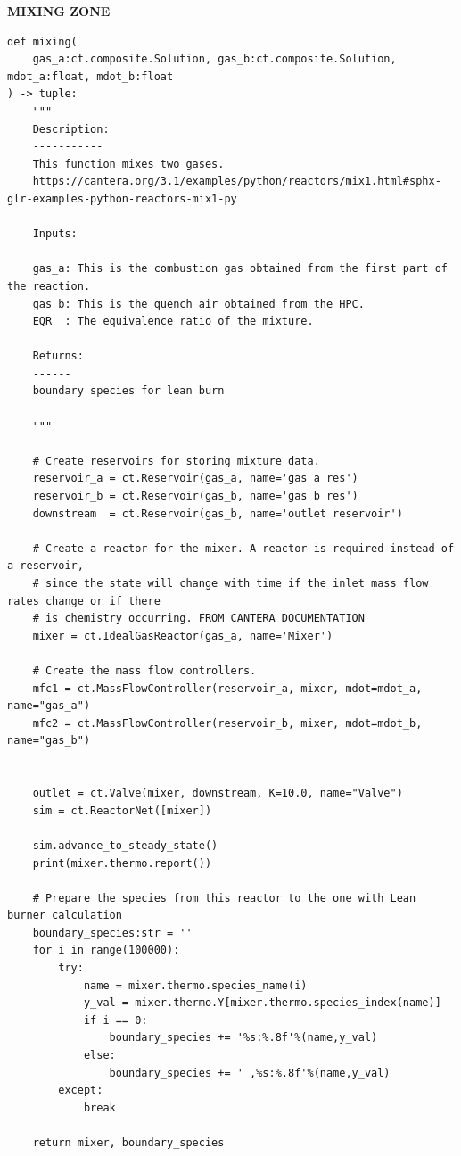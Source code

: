 \clearpage


\textbf{MIXING ZONE}

\begin{verbatim}
def mixing(
    gas_a:ct.composite.Solution, gas_b:ct.composite.Solution, mdot_a:float, mdot_b:float
) -> tuple:
    """
    Description:
    -----------
    This function mixes two gases.
    https://cantera.org/3.1/examples/python/reactors/mix1.html#sphx-glr-examples-python-reactors-mix1-py

    Inputs:
    ------
    gas_a: This is the combustion gas obtained from the first part of the reaction.
    gas_b: This is the quench air obtained from the HPC.
    EQR  : The equivalence ratio of the mixture.

    Returns:
    ------
    boundary species for lean burn
    
    """

    # Create reservoirs for storing mixture data.
    reservoir_a = ct.Reservoir(gas_a, name='gas a res')
    reservoir_b = ct.Reservoir(gas_b, name='gas b res')
    downstream  = ct.Reservoir(gas_b, name='outlet reservoir')

    # Create a reactor for the mixer. A reactor is required instead of a reservoir, 
    # since the state will change with time if the inlet mass flow rates change or if there 
    # is chemistry occurring. FROM CANTERA DOCUMENTATION
    mixer = ct.IdealGasReactor(gas_a, name='Mixer')

    # Create the mass flow controllers.
    mfc1 = ct.MassFlowController(reservoir_a, mixer, mdot=mdot_a, name="gas_a")
    mfc2 = ct.MassFlowController(reservoir_b, mixer, mdot=mdot_b, name="gas_b")


    outlet = ct.Valve(mixer, downstream, K=10.0, name="Valve")
    sim = ct.ReactorNet([mixer])

    sim.advance_to_steady_state()
    print(mixer.thermo.report())

    # Prepare the species from this reactor to the one with Lean burner calculation
    boundary_species:str = ''
    for i in range(100000):
        try:
            name = mixer.thermo.species_name(i)
            y_val = mixer.thermo.Y[mixer.thermo.species_index(name)]
            if i == 0:
                boundary_species += '%s:%.8f'%(name,y_val)
            else:
                boundary_species += ' ,%s:%.8f'%(name,y_val)
        except:
            break
   
    return mixer, boundary_species
\end{verbatim}

